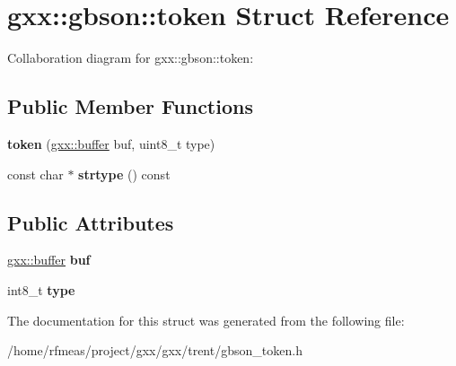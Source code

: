 \hypertarget{structgxx_1_1gbson_1_1token}{}\section{gxx\+:\+:gbson\+:\+:token Struct Reference}
\label{structgxx_1_1gbson_1_1token}


Collaboration diagram for gxx\+:\+:gbson\+:\+:token\+:
\subsection*{Public Member Functions}
\begin{DoxyCompactItemize}
\item 
{\bfseries token} (\hyperlink{classgxx_1_1buffer}{gxx\+::buffer} buf, uint8\+\_\+t type)\hypertarget{structgxx_1_1gbson_1_1token_ac3a6e362108926a8b995f6bcb090d132}{}\label{structgxx_1_1gbson_1_1token_ac3a6e362108926a8b995f6bcb090d132}

\item 
const char $\ast$ {\bfseries strtype} () const \hypertarget{structgxx_1_1gbson_1_1token_a0edaedc5f9da4b80419def0af0b11cf1}{}\label{structgxx_1_1gbson_1_1token_a0edaedc5f9da4b80419def0af0b11cf1}

\end{DoxyCompactItemize}
\subsection*{Public Attributes}
\begin{DoxyCompactItemize}
\item 
\hyperlink{classgxx_1_1buffer}{gxx\+::buffer} {\bfseries buf}\hypertarget{structgxx_1_1gbson_1_1token_a4a2be446afa1738cba0085d9278d39fd}{}\label{structgxx_1_1gbson_1_1token_a4a2be446afa1738cba0085d9278d39fd}

\item 
int8\+\_\+t {\bfseries type}\hypertarget{structgxx_1_1gbson_1_1token_a62cc178262e0215d13920d3a65686cc0}{}\label{structgxx_1_1gbson_1_1token_a62cc178262e0215d13920d3a65686cc0}

\end{DoxyCompactItemize}


The documentation for this struct was generated from the following file\+:\begin{DoxyCompactItemize}
\item 
/home/rfmeas/project/gxx/gxx/trent/gbson\+\_\+token.\+h\end{DoxyCompactItemize}
